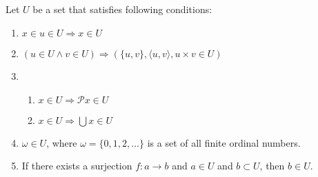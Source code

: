 \documentclass[luatex]{article}
\begin{document}
\subsubsection{}



\subsubsection{}



\subsubsection{}



\subsubsection{}



\subsubsection{}



\subsubsection{}



\subsubsection{}



\subsection{}

Let $U$ be a set that satisfies following conditions:

\begin{enumerate}[label=(\roman*)]
\item $x \in u \in U \Rightarrow x \in U$
\item $(u \in U \wedge v \in U) \Rightarrow (\{u, v\}, \langle u, v \rangle, u \times v \in U)$
\item \begin{enumerate}[label=(\arabic*)]
\item $x \in U \Rightarrow \mathcal{P} x \in U$
\item $x \in U \Rightarrow \bigcup x \in U$
\end{enumerate}
\item $\omega \in U$, where $\omega = \{0,1,2,\dots\}$ is a set of all finite ordinal numbers.
\item If there exists a surjection $f : a \rightarrow b$ and $a \in U$ and $b \subset U$, then $b \in U$.
\end{enumerate}
\end{document}
